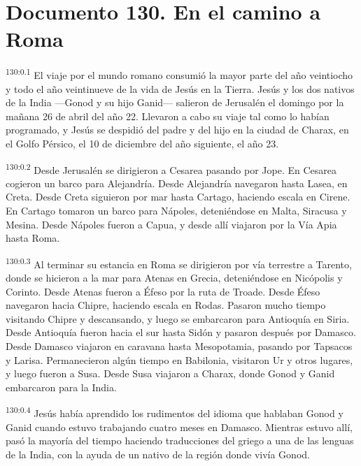 \chapter{Documento 130. En el camino a Roma}
\par 
\textsuperscript{130:0.1} El viaje por el mundo romano consumió la mayor parte del año veintiocho y todo el año veintinueve de la vida de Jesús en la Tierra. Jesús y los dos nativos de la India ---Gonod y su hijo Ganid--- salieron de Jerusalén el domingo por la mañana 26 de abril del año 22. Llevaron a cabo su viaje tal como lo habían programado, y Jesús se despidió del padre y del hijo en la ciudad de Charax, en el Golfo Pérsico, el 10 de diciembre del año siguiente, el año 23.

\par 
\textsuperscript{130:0.2} Desde Jerusalén se dirigieron a Cesarea pasando por Jope. En Cesarea cogieron un barco para Alejandría. Desde Alejandría navegaron hasta Lasea, en Creta. Desde Creta siguieron por mar hasta Cartago, haciendo escala en Cirene. En Cartago tomaron un barco para Nápoles, deteniéndose en Malta, Siracusa y Mesina. Desde Nápoles fueron a Capua, y desde allí viajaron por la Vía Apia hasta Roma.

\par 
\textsuperscript{130:0.3} Al terminar su estancia en Roma se dirigieron por vía terrestre a Tarento, donde se hicieron a la mar para Atenas en Grecia, deteniéndose en Nicópolis y Corinto. Desde Atenas fueron a Éfeso por la ruta de Troade. Desde Éfeso navegaron hacia Chipre, haciendo escala en Rodas. Pasaron mucho tiempo visitando Chipre y descansando, y luego se embarcaron para Antioquía en Siria. Desde Antioquía fueron hacia el sur hasta Sidón y pasaron después por Damasco. Desde Damasco viajaron en caravana hasta Mesopotamia, pasando por Tapsacos y Larisa. Permanecieron algún tiempo en Babilonia, visitaron Ur y otros lugares, y luego fueron a Susa. Desde Susa viajaron a Charax, donde Gonod y Ganid embarcaron para la India.

\par 
\textsuperscript{130:0.4} Jesús había aprendido los rudimentos del idioma que hablaban Gonod y Ganid cuando estuvo trabajando cuatro meses en Damasco. Mientras estuvo allí, pasó la mayoría del tiempo haciendo traducciones del griego a una de las lenguas de la India, con la ayuda de un nativo de la región donde vivía Gonod.

